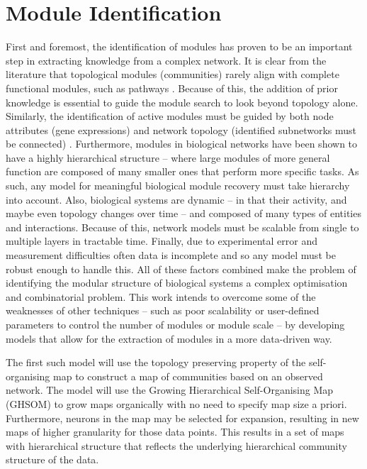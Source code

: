 \documentclass{report}
\begin{document}
	\section{Module Identification}
	First and foremost, the identification of modules has proven to be an important step in extracting knowledge from a complex network. It is clear from the literature that topological modules (communities) rarely align with complete functional modules, such as pathways \cite{he2016cooperative}. Because of this, the addition of prior knowledge is essential to guide the module search to look beyond topology alone. Similarly, the identification of active modules must be guided by both node attributes (gene expressions) and network topology (identified subnetworks must be connected) \cite{ideker2002discovering}. Furthermore, modules in biological networks have been shown to have a highly hierarchical structure -- where large modules of more general function are composed of many smaller ones that perform more specific tasks. As such, any model for meaningful biological module recovery must take hierarchy into account. Also, biological systems are dynamic -- in that their activity, and maybe even topology changes over time -- and composed of many types of entities and interactions. Because of this, network models must be scalable from single to multiple layers in tractable time. Finally, due to experimental error and measurement difficulties often data is incomplete and so any model must be robust enough to handle this. All of these factors combined make the problem of identifying the modular structure of biological systems a complex optimisation and combinatorial problem. This work intends to overcome some of the weaknesses of other techniques -- such as poor scalability or user-defined parameters to control the number of modules or module scale -- by developing models that allow for the extraction of modules in a more data-driven way.
	
	The first such model will use the topology preserving property of the self-organising map to construct a map of communities based on an observed network. The model will use the Growing Hierarchical Self-Organising Map (GHSOM) \cite{dittenbach2000growing} to grow maps organically with no need to specify map size a priori. Furthermore, neurons in the map may be selected for expansion, resulting in new maps of higher granularity for those data points. This results in a set of maps with hierarchical structure that reflects the underlying hierarchical community structure of the data.
	
\end{document}

